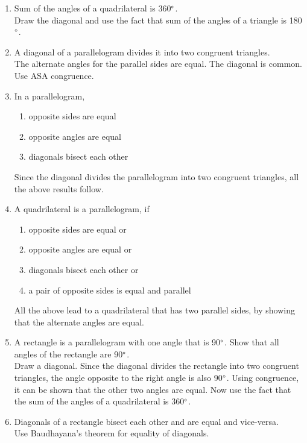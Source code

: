 \renewcommand{\theequation}{\theenumi}
\begin{enumerate}[label=\arabic*.,ref=\thesubsection.\theenumi]
\item Sum of the angles of a quadrilateral is 360$\degree$. 
\\
\solution Draw the diagonal and use the fact that sum of the angles of a triangle is 180$\degree$.
\item  A diagonal of a parallelogram divides it into two congruent triangles. 
\\
\solution The alternate angles for the parallel sides are equal.  The diagonal is common.  Use ASA congruence.
%
\item  In a parallelogram, 
\begin{enumerate}
\item opposite sides are equal 
\item  opposite angles are equal
\item  diagonals bisect each other
\end{enumerate}
%
\solution Since the diagonal divides the parallelogram into two congruent triangles, all the above results follow.
%
\item  A quadrilateral is a parallelogram, if 
%
\begin{enumerate}
\item opposite sides are equal or 
\item  opposite angles are equal or 
\item  diagonals bisect each other or 
\item a pair of opposite sides is equal and parallel
\end{enumerate}
%
\solution All the above lead to a quadrilateral that has two parallel sides, by showing that the alternate angles are equal.
%
%
\item A rectangle is a parallelogram with one angle that is 90$\degree$.  Show that all angles of the rectangle are 90$\degree$.
%
\\
\solution Draw a diagonal.  Since the diagonal divides the rectangle into two congruent triangles, the angle opposite to the right angle is also 90$\degree$. Using congruence, it can be shown that the other two angles are equal.  Now use the fact that the sum of the angles of a quadrilateral is 360$\degree$.
%
\item  Diagonals of a rectangle bisect each other and are equal and vice-versa. 
%
\\
\solution Use Baudhayana's theorem for equality of diagonals.

\end{enumerate}
